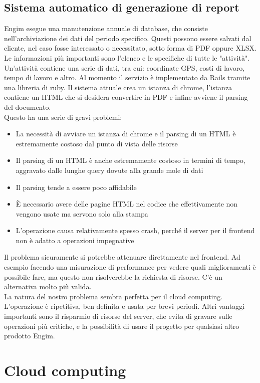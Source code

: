 \documentclass[12pt]{article}
\begin{document}
\subsection{Sistema automatico di generazione di report}
Engim esegue una manutenzione annuale di database, che consiste nell'archiviazione
dei dati del periodo specifico.
Questi possono essere salvati dal cliente, nel caso fosse interessato 
o necessitato, sotto forma di PDF oppure XLSX.
\\ 
Le informazioni più importanti sono l'elenco e le specifiche di tutte le "attività". 
Un'attività contiene una serie di dati, tra cui: coordinate
GPS, costi di lavoro, tempo di lavoro e altro.  
Al momento il servizio è implementato da Rails tramite una libreria di ruby. 
Il sistema attuale crea un istanza di chrome, l'istanza contiene un HTML
che si desidera convertire in PDF e infine avviene il parsing del documento.
\\ Questo ha una serie di gravi problemi:
\begin{itemize}
  \item La necessità di avviare un istanza di chrome e il parsing di un HTML è
  estremamente costoso dal punto di vista delle risorse
  \item Il parsing di un HTML è anche estremamente costoso in termini di tempo,
  aggravato dalle lunghe query dovute alla grande mole di dati 
  \item Il  parsing tende a essere poco affidabile
  \item È necessario avere delle pagine HTML nel codice che effettivamente 
  non vengono usate ma servono solo alla stampa 
  \item L'operazione causa relativamente spesso crash, perché il server 
  per il frontend non è adatto a operazioni impegnative
\end{itemize}
Il problema sicuramente si potrebbe attenuare direttamente nel frontend. 
Ad esempio facendo una misurazione di performance per vedere quali 
miglioramenti è possibile fare, ma questo non risolverebbe la richiesta di risorse. 
C'è un alternativa molto più valida.
\\ La natura del nostro problema sembra perfetta per il cloud computing.
L'operazione è ripetitiva, ben definita e usata per brevi periodi. Altri vantaggi 
importanti sono il risparmio di risorse del server, che evita di gravare sulle 
operazioni più critiche, e la possibilità di usare il progetto per qualsiasi 
altro prodotto Engim.

\section{Cloud computing}
\end{document}
